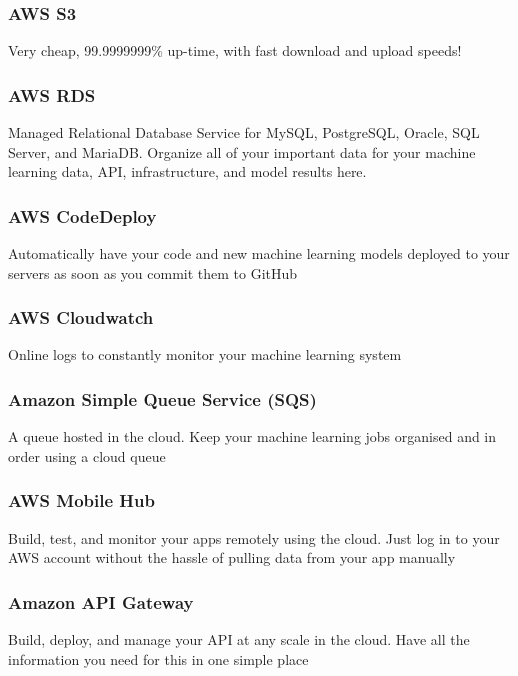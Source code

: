 \begin{frame}\frametitle{AWS S3}
Very cheap, 99.9999999\% up-time, with fast download and upload speeds!
\end{frame}

\begin{frame}\frametitle{AWS RDS}
Managed Relational Database Service for MySQL, PostgreSQL, Oracle, SQL Server, and MariaDB. Organize all of your important data for your machine learning data, API, infrastructure, and model results here.
\end{frame}

\begin{frame}\frametitle{AWS CodeDeploy}
Automatically have your code and new machine learning models deployed to your servers as soon as you commit them to GitHub
\end{frame}


\begin{frame}\frametitle{AWS Cloudwatch}
Online logs to constantly monitor your machine learning system
\end{frame}

\begin{frame}\frametitle{Amazon Simple Queue Service (SQS)}
A queue hosted in the cloud. Keep your machine learning jobs organised and in order using a cloud queue
\end{frame}

\begin{frame}\frametitle{AWS Mobile Hub}
Build, test, and monitor your apps remotely using the cloud. Just log in to your AWS account without the hassle of pulling data from your app manually
\end{frame}


\begin{frame}\frametitle{Amazon API Gateway}
Build, deploy, and manage your API at any scale in the cloud. Have all the information you need for this in one simple place
\end{frame}

